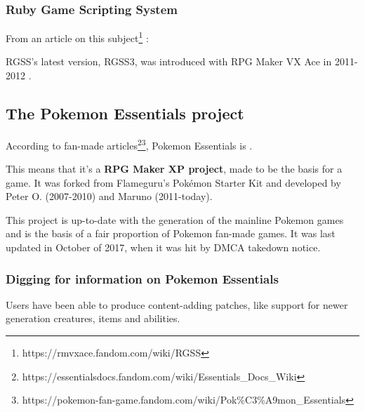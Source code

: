 \documentclass[11pt]{article}
\begin{document}
\subsubsection{Ruby Game Scripting System}

From an article on this subject\footnote{https://rmvxace.fandom.com/wiki/RGSS} : 


RGSS's latest version, RGSS3, was introduced with RPG Maker VX Ace in 2011-2012 \cite{rgssspec,rmvxacerelease}.






\subsection{The Pokemon Essentials project}


According to fan-made articles\footnote{https://essentialsdocs.fandom.com/wiki/Essentials\_Docs\_Wiki}\footnote{https://pokemon-fan-game.fandom.com/wiki/Pok\%C3\%A9mon\_Essentials}, Pokemon Essentials is .

This means that it's a \textbf{RPG Maker XP project}, made to be the basis for a game. It was forked from Flameguru's Pokémon Starter Kit and developed by Peter O. (2007-2010) and Maruno (2011-today).

This project is up-to-date with the  generation of the mainline Pokemon games and is the basis of a fair proportion of Pokemon fan-made games. It was last updated in October of 2017, when it was hit by DMCA takedown notice.

\newpage
\subsubsection{Digging for information on Pokemon Essentials}

Users have been able to produce content-adding patches, like support for newer generation creatures, items and abilities.
\end{document}
